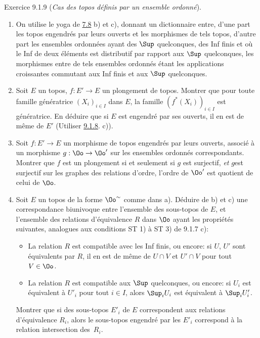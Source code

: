 \documentclass[10pt]{../fichiers-configuration-latex/smfart}
\begin{document}
\begin{enonce*}[remark]{Exercice 9.1.9}
(\emph{Cas des topos définis par un ensemble ordonné}).

\begin{enumerate}
\renewcommand{\theenumi}{\alph{enumi}}
\renewcommand{\labelenumi}{\theenumi)}
\item On utilise le yoga de \hyperref[IV.exer7.8]{7.8} b) et c), donnant un dictionnaire
entre, d'une part les topos engendrés par leurs ouverts et les
morphismes de tels topos, d'autre part les ensembles ordonnées ayant
des $\Sup$ quelconques, des Inf finis et où le Inf de deux éléments %
est distributif par rapport aux $\Sup$  quelconques, les morphismes
entre de tels ensembles ordonnés étant les applications croissantes
commutant aux Inf finis et aux $\Sup$ quelconques.

\item Soit $E$ un topos, $f:E'\rightarrow E$ un plongement de
topos. Montrer que pour toute famille génératrice $(X_i)_{i\in I}$
dans $E$, la famille $(f^{\ast}(X_i))_{i \in I}$ est génératrice. En
déduire que si $E$ est engendré par ses ouverts, il en est de même
de $E'$ (Utiliser \hyperref[IV.exer9.1.8]{9.1.8}. c)).

\item Soit $f:E'\rightarrow E$ un morphisme de topos engendrés par
leurs ouverts, associé à un morphisme $g:\Oo\rightarrow \Oo'$ sur
les ensembles ordonnés correspondants. Montrer que $f$ est un
plongement si et seulement si $g$ est surjectif, \emph{et}
$g$\pageoriginale est surjectif sur les graphes des relations
d'ordre, \ie l'ordre de $\Oo'$ est quotient de celui de $\Oo$.

\item Soit $E$ un topos de la forme $\Oo^{\sim}$ comme dans
a). Déduire de b) et c) une correspondance biunivoque entre
l'ensemble des sous-topos de $E$, et l'ensemble des relations
d'équivalence $R$ dans $\Oo$ ayant les propriétés suivantes,
analogues aux conditions ST 1) à ST 3) de 9.1.7 c):
\begin{itemize}
\item[Q0 1)] La relation $R$ est compatible avec les Inf finis, ou
encore: si $U$, $U'$ sont équivalents par $R$, il en est de même de
$U\cap V$ et $U'\cap V$ pour tout $V\in \Oo$.

\item[Q0 2)] La relation $R$ est compatible aux $\Sup$ quelconques,
ou encore: si $U_i$ est équivalent à $U'_i$ pour tout $i\in I$,
alors $\Sup_i U_i$ est équivalent à $\Sup_i U'_i$.
\end{itemize}

Montrer que si des sous-topos $E'_i$ de $E$ correspondent aux
relations d'équivalence $R_i$, alors le sous-topos engendré par les
$E'_i$ correspond à la relation intersection des~$R_i$.
\end{enumerate}
\end{enonce*}
\end{document}
